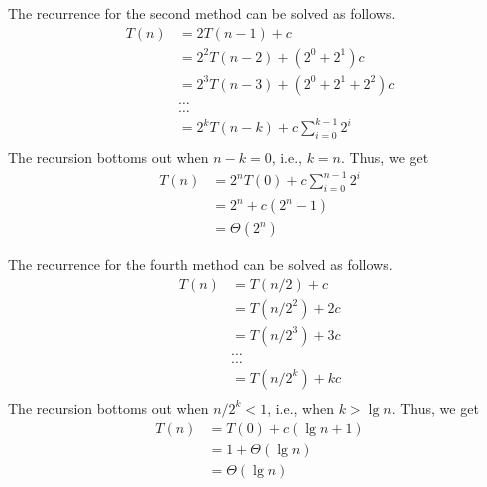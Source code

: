 \documentclass[11pt,twoside]{article}
\begin{document}
The recurrence for the second method can be solved as follows.
\begin{align*}
T(n) & =  2T(n-1) + c \\
& =  2^2T(n-2) + (2^0 + 2^1)c \\
& =  2^3T(n-3) + (2^0 + 2^1 + 2^2)c\\
&  \ldots \\
&  \ldots \\
& =  2^kT(n-k) + c\sum_{i=0}^{k-1}2^i \\
\end{align*}
\noindent
The recursion bottoms out when $n-k=0$, i.e., $k=n$. Thus, we get
\begin{align*}
T(n) & =  2^{n}T(0) + c\sum_{i=0}^{n-1}2^i \\ 
     & =  2^{n} + c(2^{n} -1) \\
     & =  \Theta(2^n)
\end{align*}

The recurrence for the fourth method can be solved as follows.
\begin{align*}
T(n) & =  T(n/2) + c \\
& =  T(n/2^2) + 2c \\
& =  T(n/2^3) + 3c \\
&  \ldots \\
&  \ldots \\
& =  T(n/2^k) + kc \\
\end{align*}
\noindent
The recursion bottoms out when $n/2^k < 1$, i.e., when $k> \lg n$. Thus, we get
\begin{align*}
T(n) & =  T(0) + c(\lg n + 1)\\
     & =  1  + \Theta(\lg n)\\
     & =  \Theta(\lg n)
\end{align*}
\end{document}
